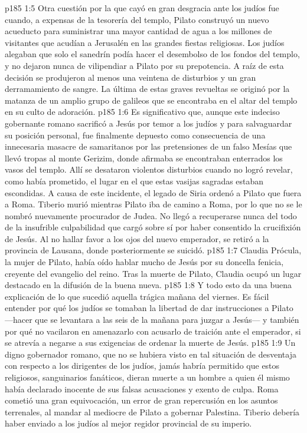 \vs p185 1:5 \pc Otra cuestión por la que cayó en gran desgracia ante los judíos fue cuando, a expensas de la tesorería del templo, Pilato construyó un nuevo acueducto para suministrar una mayor cantidad de agua a los millones de visitantes que acudían a Jerusalén en las grandes fiestas religiosas. Los judíos alegaban que solo el sanedrín podía hacer el desembolso de los fondos del templo, y no dejaron nunca de vilipendiar a Pilato por su prepotencia. A raíz de esta decisión se produjeron al menos una veintena de disturbios y un gran derramamiento de sangre. La última de estas graves revueltas se originó por la matanza de un amplio grupo de galileos que se encontraba en el altar del templo en su culto de adoración.
\vs p185 1:6 \pc Es significativo que, aunque este indeciso gobernante romano sacrificó a Jesús por temor a los judíos y para salvaguardar su posición personal, fue finalmente depuesto como consecuencia de una innecesaria masacre de samaritanos por las pretensiones de un falso Mesías que llevó tropas al monte Gerizim, donde afirmaba se encontraban enterrados los vasos del templo. Allí se desataron violentos disturbios cuando no logró revelar, como había prometido, el lugar en el que estas vasijas sagradas estaban escondidas. A causa de este incidente, el legado de Siria ordenó a Pilato que fuera a Roma. Tiberio murió mientras Pilato iba de camino a Roma, por lo que no se le nombró nuevamente procurador de Judea. No llegó a recuperarse nunca del todo de la insufrible culpabilidad que cargó sobre sí por haber consentido la crucifixión de Jesús. Al no hallar favor a los ojos del nuevo emperador, se retiró a la provincia de Lausana, donde posteriormente se suicidó.
\vs p185 1:7 \pc Claudia Prócula, la mujer de Pilato, había oído hablar mucho de Jesús por su doncella fenicia, creyente del evangelio del reino. Tras la muerte de Pilato, Claudia ocupó un lugar destacado en la difusión de la buena nueva.
\vs p185 1:8 \pc Y todo esto da una buena explicación de lo que sucedió aquella trágica mañana del viernes. Es fácil entender por qué los judíos se tomaban la libertad de dar instrucciones a Pilato ---hacer que se levantara a las seis de la mañana para juzgar a Jesús--- y también por qué no vacilaron en amenazarlo con acusarlo de traición ante el emperador, si se atrevía a negarse a sus exigencias de ordenar la muerte de Jesús.
\vs p185 1:9 Un digno gobernador romano, que no se hubiera visto en tal situación de desventaja con respecto a los dirigentes de los judíos, jamás habría permitido que estos religiosos, sanguinarios fanáticos, dieran muerte a un hombre a quien él mismo había declarado inocente de sus falsas acusaciones y exento de culpa. Roma cometió una gran equivocación, un error de gran repercusión en los asuntos terrenales, al mandar al mediocre de Pilato a gobernar Palestina. Tiberio debería haber enviado a los judíos al mejor regidor provincial de su imperio.
